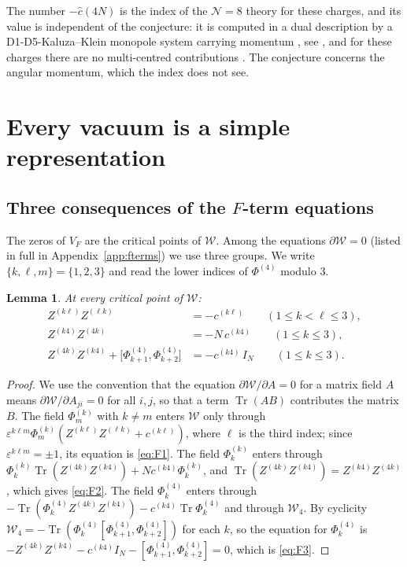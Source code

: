 \documentclass[11pt]{amsart}
\newtheorem{lemma}[theorem]{Lemma}
\theoremstyle{definition}
\newcommand{\Tr}{\operatorname{Tr}}
\newcommand{\cW}{\mathcal W}
\begin{document}
The number $-\hat c(4N)$ is the index of the $\mathcal N=8$ theory for these charges, and its value is independent of the conjecture: it is computed in a dual description by a D1-D5-Kaluza--Klein monopole system carrying momentum \cite{SSY06}, see \cite[Section~2]{CGMS16}, and for these charges there are no multi-centred contributions \cite{Sen08b,Sen10}. The conjecture concerns the angular momentum, which the index does not see.

\section{Every vacuum is a simple representation}\label{sec:simple}

\subsection{Three consequences of the \texorpdfstring{$F$}{F}-term equations}
The zeros of $V_F$ are the critical points of $\cW$. Among the equations $\partial\cW=0$ (listed in full in Appendix~\ref{app:fterms}) we use three groups. We write $\{k,\ell,m\}=\{1,2,3\}$ and read the lower indices of $\Phi^{(4)}$ modulo $3$.

\begin{lemma}\label{lem:F}
At every critical point of $\cW$:
\begin{align}
Z^{(k\ell)}Z^{(\ell k)}&=-c^{(k\ell)}\qquad(1\le k<\ell\le 3),\label{eq:F1}\\
Z^{(k4)}Z^{(4k)}&=-N\,c^{(k4)}\qquad(1\le k\le3),\label{eq:F2}\\
Z^{(4k)}Z^{(k4)}+\big[\Phi^{(4)}_{k+1},\Phi^{(4)}_{k+2}\big]&=-c^{(k4)}\,I_N\qquad(1\le k\le3).\label{eq:F3}
\end{align}
\end{lemma}

\begin{proof}
We use the convention that the equation $\partial\cW/\partial A=0$ for a matrix field $A$ means $\partial\cW/\partial A_{ji}=0$ for all $i,j$, so that a term $\Tr(AB)$ contributes the matrix $B$. The field $\Phi^{(k)}_m$ with $k\ne m$ enters $\cW$ only through $\varepsilon^{k\ell m}\Phi^{(k)}_m(Z^{(k\ell)}Z^{(\ell k)}+c^{(k\ell)})$, where $\ell$ is the third index; since $\varepsilon^{k\ell m}=\pm1$, its equation is \eqref{eq:F1}. The field $\Phi^{(k)}_k$ enters through $\Phi^{(k)}_k\Tr(Z^{(4k)}Z^{(k4)})+Nc^{(k4)}\Phi^{(k)}_k$, and $\Tr(Z^{(4k)}Z^{(k4)})=Z^{(k4)}Z^{(4k)}$, which gives \eqref{eq:F2}. The field $\Phi^{(4)}_k$ enters through $-\Tr(\Phi^{(4)}_kZ^{(4k)}Z^{(k4)})-c^{(k4)}\Tr\Phi^{(4)}_k$ and through $\cW_4$. By cyclicity $\cW_4=-\Tr(\Phi^{(4)}_k[\Phi^{(4)}_{k+1},\Phi^{(4)}_{k+2}])$ for each $k$, so the equation for $\Phi^{(4)}_k$ is $-Z^{(4k)}Z^{(k4)}-c^{(k4)}I_N-[\Phi^{(4)}_{k+1},\Phi^{(4)}_{k+2}]=0$, which is \eqref{eq:F3}.
\end{proof}
\end{document}
